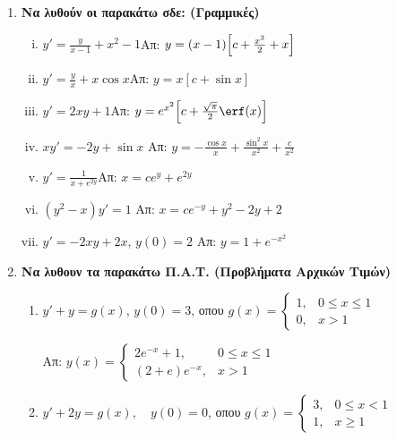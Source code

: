 


\pagestyle{askhseis}





\begin{center}
\end{center}

\vspace{\baselineskip}

\begin{enumerate}
  \item {\bfseries Να λυθούν οι παρακάτω σδε: (Γραμμικές)}
    \begin{enumerate}[i)]
      \item $y'=\frac{y}{x-1}+x^2-1$\hfill Απ: $y=(x-1)\Bigl[c+\frac{x^2}{2}+x\Bigr]$
      \item $y'=\frac{y}{x}+x\cos x$\hfill Απ: $y=x[c+\sin x]$
      \item $y'=2xy+1$\hfill Απ: $y=e^{x^2}\Bigl[c+\frac{\sqrt{\pi}}{2}\erf(x)\Bigr]$
      \item $xy'=-2y+ \sin{x}$ \hfill Απ: $ y= - \frac{\cos{x}}{x} +
        \frac{\sin^{2}{x}}{x^{2}} + \frac{c}{x^{2}} $ 
      \item $y'=\frac{1}{x+e^{2y}}$\hfill Απ: $x=ce^y+e^{2y}$
      \item $ (y^{2}-x)y'=1 $ \hfill Απ: $ x = ce^{-y}+y^{2}-2y+2 $ 
      \item $ y'=-2xy+2x $, \quad $ y(0)=2 $ \hfill Απ: $ y=1+e^{-x^{2}} $  
    \end{enumerate}

  \item {\bfseries Να λυθουν τα παρακάτω Π.Α.Τ. (Προβλήματα Αρχικών Τιμών)}
    \begin{enumerate}
      \item $y'+y=g(x)$, \quad $ y(0)=3 $, οπου 
        $g(x)=\begin{cases}1, & 0\leq x\leq 1 \\ 0, & x>1\end{cases}$ 

        \hfill Απ: $y(x)=\begin{cases} 2e^{-x}+1, & 0\leq x\leq 1 \\ 
        (2+e)e^{-x}, & x>1\end{cases}$

      \item $y'+2y=g(x),\quad y(0)=0$, οπου 
        $g(x)=\begin{cases}3, & 0\leq x<1 \\ 1, & x\geq 1 \end{cases}$


\end{enumerate}
\end{enumerate}

